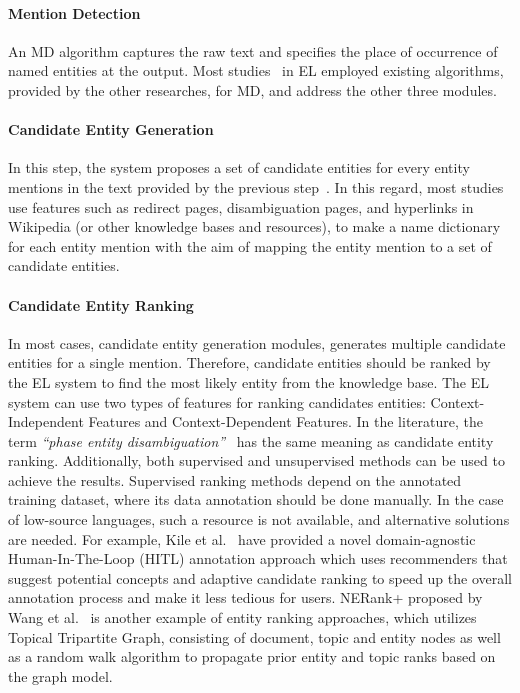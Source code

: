\documentclass{article}
\begin{document}
\paragraph{Mention Detection} An MD algorithm captures the raw text and specifies the place of occurrence of named entities at the output. Most studies~\cite{pershina2015personalized,ran2018attention,hoffart2011robust} in EL employed existing algorithms, provided by the other researches, for MD, and address the other three modules.

\paragraph{Candidate Entity Generation} In this step, the system proposes a set of candidate entities for every entity mentions in the text provided by the previous step~\cite{shen2014entity,wu2018entity}. In this regard, most studies~\cite{shen2014entity,han2009nlpr_kbp,chen2010cuny,xu2018unsupervised} use features such as redirect pages, disambiguation pages, and hyperlinks in Wikipedia (or other knowledge bases and resources), to make a name dictionary for each entity mention with the aim of mapping the entity mention to a set of candidate entities. 

\paragraph{Candidate Entity Ranking} In most cases, candidate entity generation modules, generates multiple candidate entities for a single mention. Therefore, candidate entities should be ranked by the EL system to find the most likely entity from the knowledge base\cite{taufer2017named}. The EL system can use two types of features for ranking candidates entities: Context-Independent Features and Context-Dependent Features\cite{shen2015ranking}. In the literature, the term \textit{``phase entity disambiguation''}~\cite{cucerzan2007large,dredze2010entity,yamada2016joint} has the same meaning as candidate entity ranking. Additionally, both supervised and unsupervised methods can be used to achieve the results. Supervised ranking methods depend on the annotated training dataset, where its data annotation should be done manually. In the case of low-source languages, such a resource is not available, and alternative solutions are needed. For example, Kile et al.~\cite{klie2020zero} have provided a novel domain-agnostic Human-In-The-Loop (HITL) annotation approach which uses recommenders that suggest potential concepts and adaptive candidate ranking to speed up the overall annotation process and make it less tedious for users. NERank+ proposed by Wang et al.~\cite{wang2018nerank} is another example of entity ranking approaches, which utilizes Topical Tripartite Graph, consisting of document, topic and entity nodes as well as a random walk algorithm to propagate prior entity and topic ranks based on the graph model.
\end{document}
